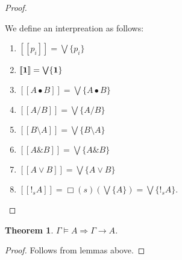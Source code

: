 \documentclass[a4paper]{article}
\theoremstyle{defin}
\theoremstyle{theorem}
\newtheorem{theorem}{Theorem}
\theoremstyle{prop}
\theoremstyle{lemma}
\theoremstyle{ex}
\theoremstyle{col}
\begin{document}
\begin{proof}
$ $

  We define an interpreation as follows:

\begin{enumerate}
  \item $[\![p_i]\!] = \bigvee \{ p_i \}$
  \item $[\![{\bf 1}]\!] = \bigvee \{ {\bf 1} \}$
  \item $[\![A \bullet B]\!] = \bigvee \{ A \bullet B \}$
  \item $[\![A / B]\!] = \bigvee \{ A / B \}$
  \item $[\![B \setminus A]\!] = \bigvee \{ B \setminus A \}$
  \item $[\![A \& B ]\!] = \bigvee \{ A \& B \}$
  \item $[\![A \lor B]\!] = \bigvee \{ A \lor B\}$
  \item $[\![!_s A]\!] = \Box(s) (\bigvee \{ A \}) = \bigvee \{ !_s A \}$.
\end{enumerate}
\end{proof}

\begin{theorem}
  $\Gamma \models A \Rightarrow \Gamma \rightarrow A$.
\end{theorem}

\begin{proof}
  Follows from lemmas above.
\end{proof}
\end{document}
